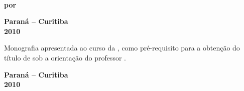 \begin{titlepage}
\begin{center}
\textsc{\large{\textsf{\textbf{\univ}\\\facu}}}
\par\vfill
\LARGE{\textsf{\textbf{\monog}}}
\par\bigskip\normalfont
\Large\textbf{\textsf{por\\\por}}
\par\vfill
\textbf{\textsf{\large{Paraná -- Curitiba\\2010}}}
\end{center}
\end{titlepage}

\clearpage\thispagestyle{empty}
\begin{center}
\textsc{\textbf{\large{\textsf{\por}}}}\par
\vfill
\LARGE{\textsf{\textbf{\monog}}}
\par\bigskip\normalfont
\end{center}
\begin{flushright}\begin{minipage}[r]{0.66\columnwidth}
Monografia apresentada ao curso \curs  da \univ,
como pré-requisito para a obtenção do título de \degree 
sob a orientação do professor \prof.
\end{minipage}
\end{flushright}
\par\vfill
\begin{center}
\textbf{\textsf{\large{Paraná -- Curitiba\\2010}}}
\end{center}
